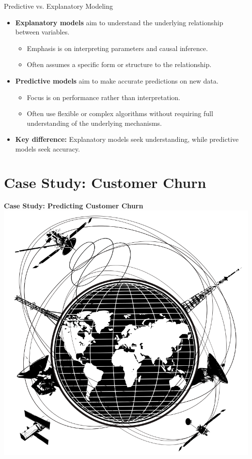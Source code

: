 \documentclass[aspectratio=169,xcolor=dvipsnames]{beamer}
\begin{document}
\begin{frame}{Predictive vs. Explanatory Modeling}

\begin{itemize}
  \item \textbf{Explanatory models} aim to understand the underlying relationship between variables.
  \begin{itemize}
    \item Emphasis is on interpreting parameters and causal inference.
    \item Often assumes a specific form or structure to the relationship.
  \end{itemize}

  \item \textbf{Predictive models} aim to make accurate predictions on new data.
  \begin{itemize}
    \item Focus is on performance rather than interpretation.
    \item Often use flexible or complex algorithms without requiring full understanding of the underlying mechanisms.
  \end{itemize}

  \item \textbf{Key difference:} Explanatory models seek understanding, while predictive models seek accuracy.
\end{itemize}

\end{frame}


\section{Case Study: Customer Churn}


\begin{frame}
	\centering
	\Large \textbf{Case Study: Predicting Customer Churn} \\
	\vspace{.5cm}
	\includegraphics[scale=.2]{images/telecom.png}
\end{frame}
\end{document}
